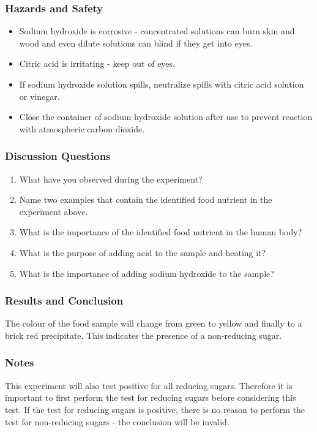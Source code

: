 \subsubsection*{Hazards and Safety}
\begin{itemize}
\item{Sodium hydroxide is corrosive - concentrated solutions can burn skin and wood and even dilute solutions can blind if they get into eyes.}
\item{Citric acid is irritating - keep out of eyes.}
\item{If sodium hydroxide solution spills, neutralize spills with citric acid solution or vinegar.}
\item{Close the container of sodium hydroxide solution after use to prevent reaction with atmospheric carbon dioxide.}
\end{itemize}

\subsubsection*{Discussion Questions}
\begin{enumerate}
\item{What have you observed during the experiment?}
\item{Name two examples that contain the identified food nutrient in the experiment above.}
\item{What is the importance of the identified food nutrient in the human body?}
\item{What is the purpose of adding acid to the sample and heating it?}
\item{What is the importance of adding sodium hydroxide to the sample?}
\end{enumerate}

\subsubsection*{Results and Conclusion}
The colour of the food sample will change from green to yellow and finally to a brick red precipitate. This indicates the presence of a non-reducing sugar.

\subsubsection*{Notes}
This experiment will also test positive for all reducing sugars. Therefore it is important to first perform the test for reducing sugars before considering this test. If the test for reducing sugars is positive, there is no reason to perform the test for non-reducing sugars - the conclusion will be invalid.

